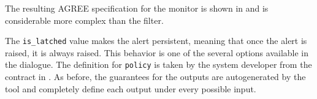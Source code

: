 The resulting AGREE specification for the monitor is shown in  and is considerable more complex than the filter.

The \texttt{is\_latched} value makes the alert persistent, meaning that once the alert is raised, it is always raised.
This behavior is one of the several options available in the dialogue.
The definition for \texttt{policy} is taken by the system developer from the contract in .
As before, the guarantees for the outputs are autogenerated by the tool and completely define each output under every possible input.
